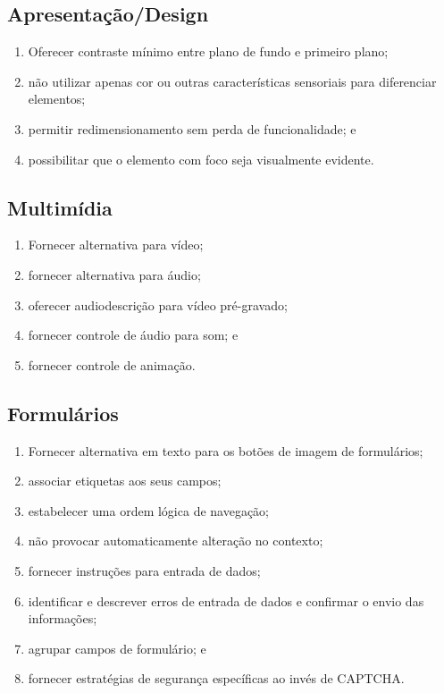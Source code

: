 \documentclass[
  12pt,
  openright,
  twoside,
  a4paper,
  english,
  french,
  spanish,
  brazil
]{abntex2}
\begin{document}
\subsection{Apresentação/Design}

\begin{enumerate}
  \item Oferecer contraste mínimo entre plano de fundo e primeiro plano;
  \item
    não utilizar apenas cor ou outras características sensoriais para
    diferenciar elementos;
  \item permitir redimensionamento sem perda de funcionalidade; e
  \item possibilitar que o elemento com foco seja visualmente evidente.
\end{enumerate}

\subsection{Multimídia}

\begin{enumerate}
  \item Fornecer alternativa para vídeo;
  \item fornecer alternativa para áudio;
  \item oferecer audiodescrição para vídeo pré-gravado;
  \item fornecer controle de áudio para som; e
  \item fornecer controle de animação.
\end{enumerate}

\subsection{Formulários}

\begin{enumerate}
  \item Fornecer alternativa em texto para os botões de imagem de formulários;
  \item associar etiquetas aos seus campos;
  \item estabelecer uma ordem lógica de navegação;
  \item não provocar automaticamente alteração no contexto;
  \item fornecer instruções para entrada de dados;
  \item
    identificar e descrever erros de entrada de dados e confirmar o envio das
    informações;
  \item agrupar campos de formulário; e
  \item fornecer estratégias de segurança específicas ao invés de CAPTCHA.
\end{enumerate}
\end{document}
